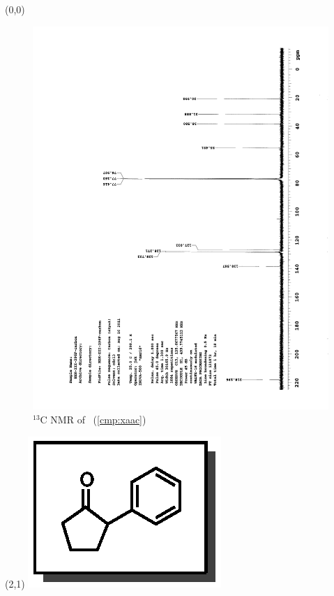 \clearpage
\begin{textblock}{20}(0,0)
\begin{figure}[htb]
\caption{$^{13}$C NMR of  \CMPxaac\ (\ref{cmp:xaac})}
\includegraphics[scale=0.75, trim = 0mm 0mm 0mm 5mm,
clip]{chp_asymmetric/images/nmr/xaacC}
\vspace{-100pt}
\end{figure}
\end{textblock}
\begin{textblock}{1}(2,1)
\includegraphics[scale=0.8, angle=90]{chp_asymmetric/images/xaac}
\end{textblock}
\clearpage

